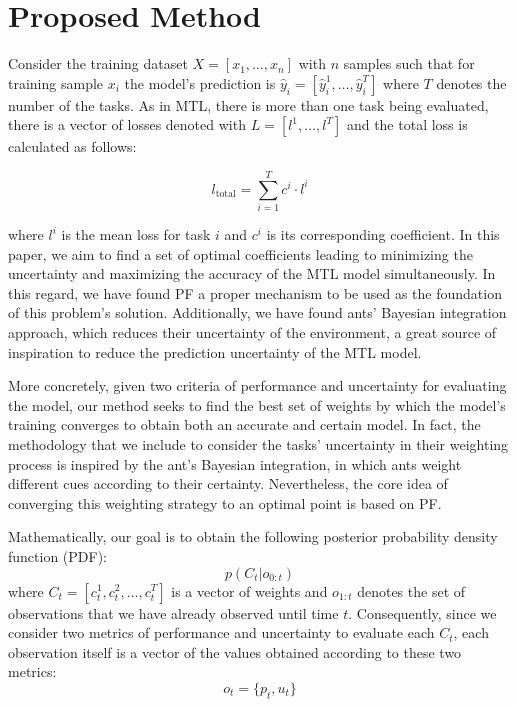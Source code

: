 \documentclass[12pt,a4paper]{article}
\begin{document}
	\section{Proposed Method}
	
	Consider the training dataset \(X = [x_1, \ldots, x_n]\) with \(n\) samples such that for training sample \(x_i\) the model's prediction is \(\hat{y}_i = [\hat{y}_i^1, \ldots, \hat{y}_i^T]\) where \(T\) denotes the number of the tasks. As in MTL, there is more than one task being evaluated, there is a vector of losses denoted with \(L = [l^1, \ldots, l^T]\) and the total loss is calculated as follows:
	
	\begin{equation}
		l_{\text{total}} = \sum_{i=1}^{T} c^i \cdot l^i
	\end{equation}
	
	where \(l^i\) is the mean loss for task \(i\) and \(c^i\) is its corresponding coefficient. In this paper, we aim to find a set of optimal coefficients leading to minimizing the uncertainty and maximizing the accuracy of the MTL model simultaneously. In this regard, we have found PF a proper mechanism to be used as the foundation of this problem's solution. Additionally, we have found ants' Bayesian integration approach, which reduces their uncertainty of the environment, a great source of inspiration to reduce the prediction uncertainty of the MTL model.
	
	More concretely, given two criteria of performance and uncertainty for evaluating the model, our method seeks to find the best set of weights by which the model's training converges to obtain both an accurate and certain model. In fact, the methodology that we include to consider the tasks' uncertainty in their weighting process is inspired by the ant's Bayesian integration, in which ants weight different cues according to their certainty. Nevertheless, the core idea of converging this weighting strategy to an optimal point is based on PF.
	
	Mathematically, our goal is to obtain the following posterior probability density function (PDF):
	\begin{equation}
		p(C_t | o_{0:t})
		\label{eq:posterior}
	\end{equation}
	where \(C_t = [c^1_t, c^2_t, \ldots, c^T_t]\) is a vector of weights and \(o_{1:t}\) denotes the set of observations that we have already observed until time \(t\). Consequently, since we consider two metrics of performance and uncertainty to evaluate each \(C_t\), each observation itself is a vector of the values obtained according to these two metrics:
	\[
	o_t = \{p_t, u_t\}
	\]
	
\end{document}
